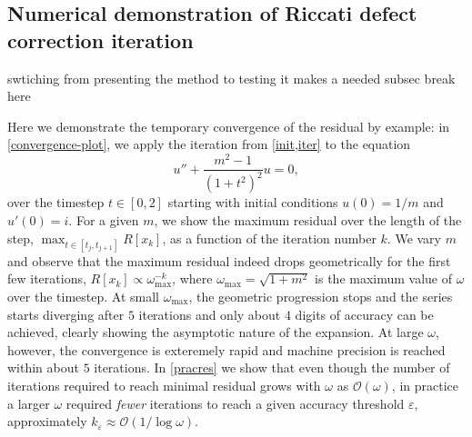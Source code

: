 \documentclass[10pt]{article}
\newcommand{\bigO}{{\mathcal O}}
\newcommand{\om}{\omega}
\newcommand{\AB}[1]{{\color{orange}#1}}
\begin{document}
\subsection{Numerical demonstration of Riccati defect correction iteration}
\AB{swtiching from presenting the method to testing it makes a needed subsec break here}

Here we demonstrate the temporary convergence of the residual by example: in \cref{convergence-plot}, we apply
the iteration from \cref{init,iter} to the equation 
\begin{equation}\label{bursteq}
    u'' + \frac{m^2 - 1}{(1+t^2)^2}u = 0,  
\end{equation}
over the timestep $t \in [0, 2]$ starting with initial conditions $u(0) = 1/m$ and
$u'(0) = i$. For a given $m$, we show the maximum residual over the length of
the step, $\max_{t \in [t_j, t_{j+1}]}R[x_k]$, as a function
of the iteration number $k$. We vary $m$ and observe that the maximum residual
indeed drops geometrically for the first few iterations, $R[x_k] \propto
\om_{\text{max}}^{-k}$, where $\om_{\text{max}} = \sqrt{1 + m^2}$ is the
maximum value of $\om$ over the timestep. At small $\om_{\text{max}}$, the
geometric progression stops and the series starts diverging after $5$
iterations and only about $4$ digits of accuracy can be achieved, clearly
showing the asymptotic nature of the expansion. At large $\om$, however, the
convergence is exteremely rapid and machine precision is reached within about
$5$ iterations. In \cref{pracres} we show that even though the number of iterations
required to reach minimal residual grows with $\om$ as $\bigO(\om)$, in
practice a larger $\om$ required \emph{fewer} iterations to reach a given
accuracy threshold $\varepsilon$, approximately $k_{\varepsilon} \approx
\bigO(1/\log\om)$.  
\end{document}
